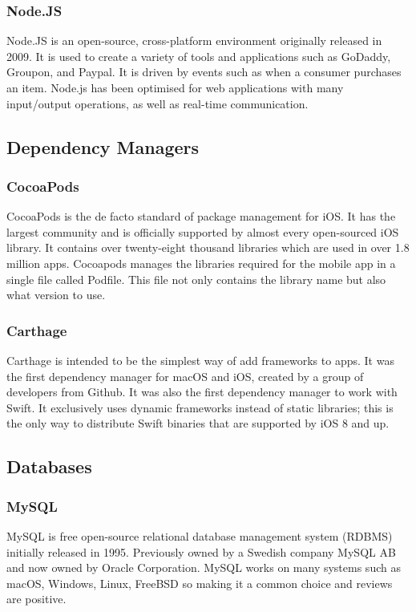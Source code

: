 \subsubsection{Node.JS}
Node.JS \cite{node} is an open-source, cross-platform environment originally released in 2009. It is used to create a variety of tools and applications such as GoDaddy, Groupon, and Paypal. It is driven by events such as when a consumer purchases an item. Node.js has been optimised for web applications with many input/output operations, as well as real-time communication.

\subsection{Dependency Managers}

\subsubsection{CocoaPods}

CocoaPods \cite{pods} is the de facto standard of package management for iOS. It has the largest community and is officially supported by almost every open-sourced iOS library. It contains over twenty-eight thousand libraries which are used in over 1.8 million apps. Cocoapods manages the libraries required for the mobile app in a single file called Podfile. This file not only contains the library name but also what version to use.

\subsubsection{Carthage}

Carthage \cite{carthage} is intended to be the simplest way of add frameworks to apps. It was the first dependency manager for macOS and iOS, created by a group of developers from Github. It was also the first dependency manager to work with Swift. It exclusively uses dynamic frameworks instead of static libraries; this is the only way to distribute Swift binaries that are supported by iOS 8 and up.

\subsection{Databases}

\subsubsection{MySQL}
MySQL \cite{sql} is free open-source relational database management system (RDBMS) initially released in 1995. Previously owned by a Swedish company MySQL AB and now owned by Oracle Corporation. MySQL works on many systems such as macOS, Windows, Linux, FreeBSD so making it a common choice and reviews are
positive.

